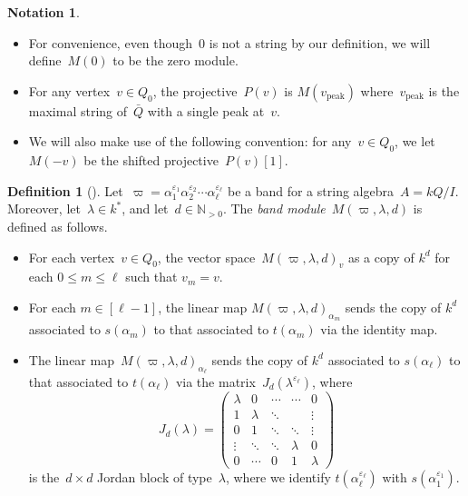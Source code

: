 \documentclass{amsart}
\theoremstyle{definition}
\newtheorem{definition}[theorem]{Definition}
\newtheorem{notation}[theorem]{Notation}
\newcommand{\N}{\mathbb{N}} %
\newcommand{\darkblue}{\color{darkblue}} %
\newcommand{\defn}[1]{\textsl{\darkblue #1}} %
\newcommand{\peak}{\mathrm{peak}} %
\begin{document}
\begin{notation}
 \begin{itemize}
  \item For convenience, even though~$0$ is not a string by our definition, we will define~$M(0)$ to be the zero module.
  \item For any vertex~$v \in Q_0$, the projective~$P(v)$ is $M(v_\peak)$ where~$v_\peak$ is the maximal string of~$\bar Q$ with a single peak at~$v$.
  \item We will also make use of the following convention: for any~$v\in Q_0$, we let~$M(-v)$ be the shifted projective~$P(v)[1]$.
 \end{itemize}
\end{notation}

\begin{definition}[\cite{ButlerRingel}]
Let~$\varpi = \alpha_1^{\varepsilon_1}\alpha_2^{\varepsilon_2}\cdots \alpha_\ell^{\varepsilon_\ell}$ be a band for a string algebra~$A=kQ/I$.
Moreover, let~$\lambda\in k^*$, and let~$d \in \N_{>0}$.
The \defn{band module}~$M(\varpi, \lambda, d)$ is defined as follows.
\begin{itemize}
\item For each vertex~$v \in Q_0$, the vector space~$M(\varpi, \lambda, d)_v$ as a copy of $k^d$ for each $0 \le m \le \ell$ such that $v_m = v$.
\item For each $m \in [\ell-1]$, the linear map $M(\varpi, \lambda, d)_{\alpha_m}$ sends the copy of $k^d$ associated to $s(\alpha_m)$ to that associated to $t(\alpha_m)$ via the identity map.
\item The linear map~$M(\varpi, \lambda, d)_{\alpha_\ell}$ sends the copy of $k^d$ associated to $s(\alpha_{\ell})$ to that associated to $t(\alpha_\ell)$ via the matrix~$J_d(\lambda^{\varepsilon_\ell})$, where
     \[
        J_d(\lambda) =
        \begin{pmatrix} 
        \lambda & 0 & \cdots & \cdots & 0 \\
        1 & \lambda & \ddots & & \vdots \\
        0 & 1 & \ddots & \ddots & \vdots \\
        \vdots & \ddots & \ddots & \lambda & 0 \\
        0 & \cdots & 0 & 1 & \lambda                                        
        \end{pmatrix}
     \]
    is the~$d\times d$ Jordan block of type~$\lambda$, where we identify $t(\alpha_{\ell}^{\varepsilon_{\ell}})$ with $s(\alpha_{1}^{\varepsilon_1})$.
  \end{itemize}
\end{definition}
\end{document}
